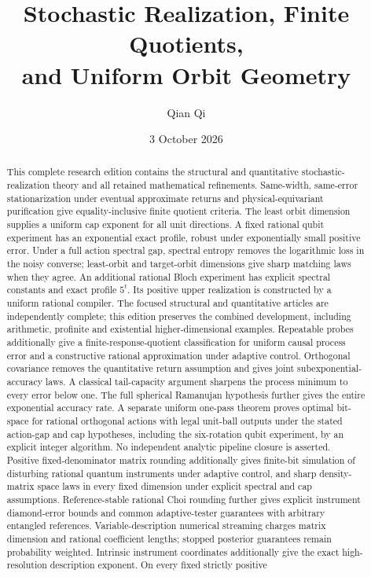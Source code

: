 \documentclass[11pt]{amsart}
\title[Stochastic realization and orbit geometry]{Stochastic Realization, Finite Quotients,\\and Uniform Orbit Geometry}
\author{Qian Qi}
\date{3 October 2026}
\numberwithin{equation}{section}
\theoremstyle{definition}\newtheorem{definition}[theorem]{Definition}
\theoremstyle{remark}\newtheorem{remark}[theorem]{Remark}
\begin{document}
\raggedbottom
\begin{abstract}
This complete research edition contains the structural and quantitative
stochastic-realization theory and all retained mathematical refinements.
Same-width, same-error stationarization under eventual approximate returns
and physical-equivariant purification give equality-inclusive finite
quotient criteria. The least orbit dimension supplies a uniform cap
exponent for all unit directions. A fixed rational qubit experiment has
an exponential exact profile, robust under exponentially small positive
error. Under a full action spectral gap, spectral entropy removes the logarithmic loss in the noisy
converse; least-orbit and target-orbit dimensions give sharp matching
laws when they agree. An additional rational Bloch experiment has
explicit spectral constants and exact profile $5^t$. Its positive upper realization is constructed by a uniform
rational compiler. The focused structural and quantitative articles are
independently complete; this edition preserves the combined development,
including arithmetic, profinite and existential higher-dimensional
examples. Repeatable probes additionally give a finite-response-quotient
classification for uniform causal process error and a constructive
rational approximation under adaptive control. Orthogonal covariance removes the quantitative return assumption and
gives joint subexponential-accuracy laws. A classical tail-capacity
argument sharpens the process minimum to every error below one.
The full spherical Ramanujan hypothesis further gives the entire
exponential accuracy rate. A separate uniform one-pass theorem proves
optimal bit-space for rational orthogonal actions with legal unit-ball
outputs under the stated action-gap and cap hypotheses, including the
six-rotation qubit experiment, by an explicit
integer algorithm. No independent analytic pipeline closure is asserted.
Positive fixed-denominator matrix rounding additionally gives
finite-bit simulation of disturbing rational quantum instruments
under adaptive control, and sharp density-matrix space laws in every
fixed dimension under explicit spectral and cap assumptions.
Reference-stable rational Choi rounding further gives explicit
instrument diamond-error bounds and common adaptive-tester guarantees
with arbitrary entangled references. Variable-description numerical
streaming charges matrix dimension and rational coefficient lengths;
stopped posterior guarantees remain probability weighted.
Intrinsic instrument coordinates additionally give the exact
high-resolution description exponent. On every fixed strictly positive

\end{abstract}
\end{document}

